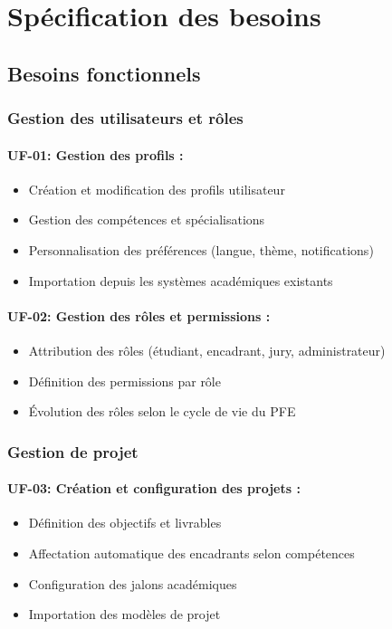 \section{Spécification des besoins}

\subsection{Besoins fonctionnels}

\subsubsection{Gestion des utilisateurs et rôles}

\paragraph{UF-01: Gestion des profils :}
\begin{itemize}
    \item Création et modification des profils utilisateur
    \item Gestion des compétences et spécialisations
    \item Personnalisation des préférences (langue, thème, notifications)
    \item Importation depuis les systèmes académiques existants
\end{itemize}

\paragraph{UF-02: Gestion des rôles et permissions :}
\begin{itemize}
    \item Attribution des rôles (étudiant, encadrant, jury, administrateur)
    \item Définition des permissions par rôle
    \item Évolution des rôles selon le cycle de vie du PFE
\end{itemize}

\subsubsection{Gestion de projet}

\paragraph{UF-03: Création et configuration des projets :}
\begin{itemize}
    \item Définition des objectifs et livrables
    \item Affectation automatique des encadrants selon compétences
    \item Configuration des jalons académiques
    \item Importation des modèles de projet
\end{itemize}

